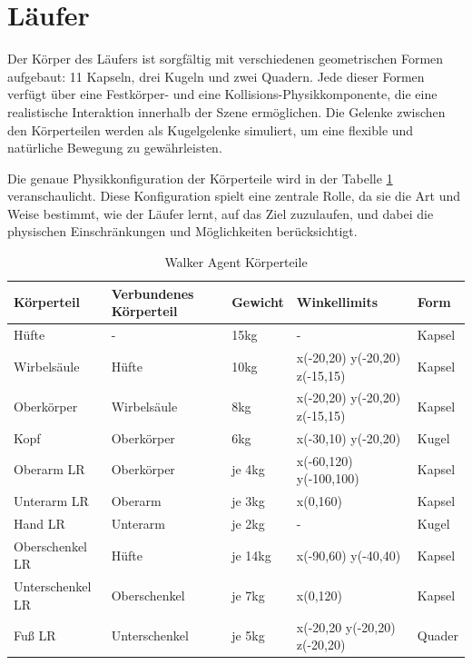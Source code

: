\section{Läufer}
Der Körper des Läufers ist sorgfältig mit verschiedenen geometrischen Formen aufgebaut: 11 Kapseln, drei Kugeln und zwei Quadern. Jede dieser Formen verfügt über eine Festkörper- und eine Kollisions-Physikkomponente, die eine realistische Interaktion innerhalb der Szene ermöglichen. Die Gelenke zwischen den Körperteilen werden als Kugelgelenke simuliert, um eine flexible und natürliche Bewegung zu gewährleisten.

Die genaue Physikkonfiguration der Körperteile wird in der Tabelle \ref{table:walker_körperteile} veranschaulicht. Diese Konfiguration spielt eine zentrale Rolle, da sie die Art und Weise bestimmt, wie der Läufer lernt, auf das Ziel zuzulaufen, und dabei die physischen Einschränkungen und Möglichkeiten berücksichtigt.

\begin{table}[H]
  \centering
  {
  \begin{tabular}{ |p{3cm}|p{3cm}|p{2cm}|p{4cm}|p{2cm}| }
  \hline
  \textbf{Körpertei}l& \textbf{Verbundenes Körperteil} & \textbf{Gewicht} & \textbf{Winkellimits} & \textbf{Form} \\
  \hline
  Hüfte & - & 15kg & - & Kapsel \\
  \hline
  Wirbelsäule & Hüfte & 10kg & x(-20,20) y(-20,20) z(-15,15) & Kapsel \\
  \hline
  Oberkörper & Wirbelsäule & 8kg & x(-20,20) y(-20,20) z(-15,15) & Kapsel \\
  \hline
  Kopf & Oberkörper & 6kg & x(-30,10) y(-20,20) & Kugel \\
  \hline
  Oberarm LR & Oberkörper & je 4kg & x(-60,120) y(-100,100) & Kapsel \\
  \hline
  Unterarm LR & Oberarm & je 3kg & x(0,160) & Kapsel \\
  \hline
  Hand LR & Unterarm & je 2kg & - & Kugel \\
  \hline
  Oberschenkel LR & Hüfte & je 14kg& x(-90,60) y(-40,40) & Kapsel \\
  \hline
  Unterschenkel LR & Oberschenkel & je 7kg &  x(0,120) & Kapsel \\
  \hline
  Fuß LR & Unterschenkel & je 5kg & x(-20,20 y(-20,20) z(-20,20) & Quader \\
  \hline
  \end{tabular}}
  \caption{Walker Agent Körperteile}
  \label{table:walker_körperteile}
\end{table}

